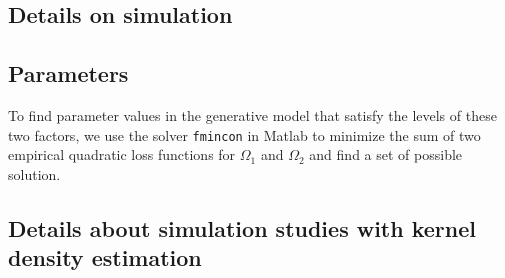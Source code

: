 \documentclass{article}
\newcommand{\itl}{\intercal}
\newcommand{\bs}{ \boldsymbol}
\begin{document}
\begin{appendices}
\section{Details on simulation }
\subsection{Parameters}
	To find parameter values in the generative model that satisfy the levels of these two factors, we use the solver \texttt{fmincon} in Matlab to minimize the sum of two empirical quadratic loss functions for $\Omega_1$ and $\Omega_2$ and find a set of possible solution. \\
	\subsection{Details about simulation studies with kernel density estimation}

\end{appendices}
\end{document}
